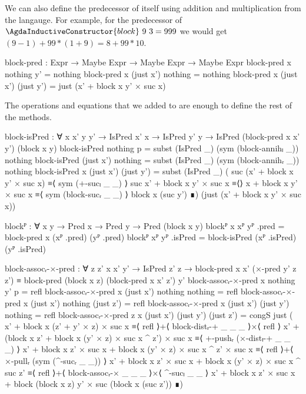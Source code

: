 We can also define the predecessor of  itself
using addition and multiplication from the langauge. For example, for the
predecessor of $\AgdaInductiveConstructor{block}\ 9\ 3 = 999$ we would get
$(9-1) + 99 * (1+9) = 8 + 99 * 10$.
\begin{code}
  block-pred :
    Expr → Maybe Expr → Maybe Expr → Maybe Expr
  block-pred x nothing    y'         = nothing
  block-pred x (just x')  nothing    = nothing
  block-pred x (just x')  (just y')  =
    just (x' + block x y' × suc x)
\end{code}
The operations and equations that we added to  are enough to
define the rest of the methods.
\begin{code}[hide]
  block-isPred :
    ∀ {x x' y y'} → IsPred x' x → IsPred y' y →
    IsPred (block-pred x x' y') (block x y)
  block-isPred nothing p = subst (IsPred _) (sym (block-annihₗ _)) nothing
  block-isPred (just x') nothing =
    subst (IsPred _) (sym (block-annihᵣ _)) nothing
  block-isPred {x} (just x') (just y') =
    subst (IsPred _)
      ( suc (x' + block x y' × suc x) ≡⟨ sym (+-sucₗ _ _) ⟩
        suc x' + block x y' × suc x   ≡⟨⟩
        x + block x y' × suc x         ≡⟨ sym (block-sucᵣ _ _) ⟩
        block x (suc y')               ∎)
      (just (x' + block x y' × suc x))

  blockᴾ : ∀ {x y} → Pred x → Pred y → Pred (block x y)
  blockᴾ {x} xᴾ yᴾ .pred = block-pred x (xᴾ .pred) (yᴾ .pred)
  blockᴾ xᴾ yᴾ .isPred = block-isPred (xᴾ .isPred) (yᴾ .isPred)

  block-assocᵣ-×-pred :
    ∀ {z z'} x x' y' → IsPred z' z →
    block-pred x x' (×-pred y' z z') ≡
    block-pred (block x z) (block-pred x x' z') y'
  block-assocᵣ-×-pred x nothing y' p = refl
  block-assocᵣ-×-pred x (just x') nothing nothing = refl
  block-assocᵣ-×-pred x (just x') nothing (just z') = refl
  block-assocᵣ-×-pred x (just x') (just y') nothing = refl
  block-assocᵣ-×-pred {z} x (just x') (just y') (just z') =
    congS just
      ( x' + block x (z' + y' × z) × suc x                                      ≡⟨ refl ⟩+⟨ block-distᵣ-+ _ _ _ ⟩×⟨ refl ⟩
        x' + (block x z' + block x (y' × z) × suc x ^ z') × suc x               ≡⟨ +-pushᵣ (×-distₗ-+ _ _ _) ⟩
        x' + block x z' × suc x + block x (y' × z) × suc x ^ z' × suc x         ≡⟨ refl ⟩+⟨ ×-pullᵣ (sym (^-sucᵣ _ _)) ⟩
        x' + block x z' × suc x + block x (y' × z) × suc x ^ suc z'             ≡⟨ refl ⟩+⟨ block-assocᵣ-× _ _ _ ⟩×⟨ ^-sucₗ _ _ ⟩
        x' + block x z' × suc x + block (block x z) y' × suc (block x (suc z')) ∎)


\end{code}
